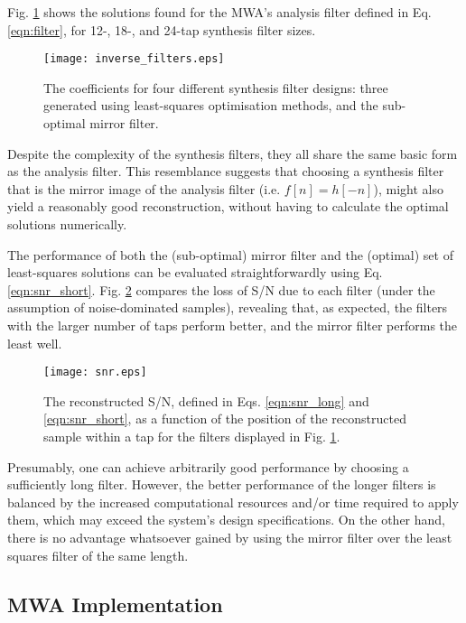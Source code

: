 \documentclass{pasa}%
\begin{document}
Fig. \ref{fig:synthfilters} shows the solutions found for the MWA's analysis filter defined in Eq. \eqref{eqn:filter}, for 12-, 18-, and 24-tap synthesis filter sizes.
\begin{figure}
    \centering
    \texttt{[image: inverse\_filters.eps]}
    \caption{The coefficients for four different synthesis filter designs: three generated using least-squares optimisation methods, and the sub-optimal mirror filter.}
    \label{fig:synthfilters}
\end{figure}
Despite the complexity of the synthesis filters, they all share the same basic form as the analysis filter.
This resemblance suggests that choosing a synthesis filter that is the mirror image of the analysis filter (i.e. $f[n] = h[-n]$), might also yield a reasonably good reconstruction, without having to calculate the optimal solutions numerically.

The performance of both the (sub-optimal) mirror filter and the (optimal) set of least-squares solutions can be evaluated straightforwardly using Eq. \eqref{eqn:snr_short}.
Fig. \ref{fig:snr} compares the loss of S/N due to each filter (under the assumption of noise-dominated samples), revealing that, as expected, the filters with the larger number of taps perform better, and the mirror filter performs the least well.
\begin{figure}
    \centering
    \texttt{[image: snr.eps]}
    \caption{The reconstructed S/N, defined in Eqs. \eqref{eqn:snr_long} and \eqref{eqn:snr_short}, as a function of the position of the reconstructed sample within a tap for the filters displayed in Fig. \ref{fig:synthfilters}.}
    \label{fig:snr}
\end{figure}

Presumably, one can achieve arbitrarily good performance by choosing a sufficiently long filter.
However, the better performance of the longer filters is balanced by the increased computational resources and/or time required to apply them, which may exceed the system's design specifications.
On the other hand, there is no advantage whatsoever gained by using the mirror filter over the least squares filter of the same length.

\subsection{MWA Implementation}
\end{document}
